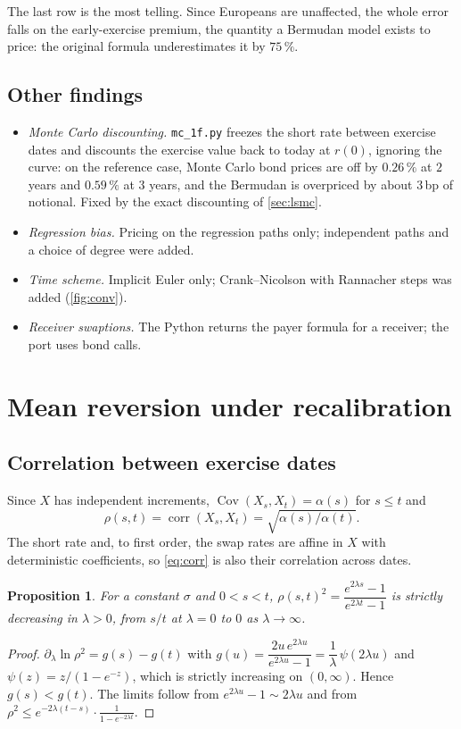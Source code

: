 \documentclass[11pt,a4paper]{article}
\newtheorem{proposition}{Proposition}
\theoremstyle{definition}
\theoremstyle{remark}
\begin{document}
The last row is the most telling. Since Europeans are unaffected, the whole error falls on the early-exercise premium, the
quantity a Bermudan model exists to price: the original formula underestimates it by $75\,\%$.

\subsection{Other findings}
\begin{itemize}
  \item \emph{Monte Carlo discounting.} \texttt{mc\_1f.py} freezes the short rate between exercise dates and discounts the
        exercise value back to today at $r(0)$, ignoring the curve: on the reference case, Monte Carlo bond prices are off by
        $0.26\,\%$ at $2$ years and $0.59\,\%$ at $3$ years, and the Bermudan is overpriced by about $3$\,bp of notional.
        Fixed by the exact discounting of \cref{sec:lsmc}.
  \item \emph{Regression bias.} Pricing on the regression paths only; independent paths and a choice of degree were added.
  \item \emph{Time scheme.} Implicit Euler only; Crank--Nicolson with Rannacher steps was added (\cref{fig:conv}).
  \item \emph{Receiver swaptions.} The Python returns the payer formula for a receiver; the port uses bond calls.
\end{itemize}

\section{Mean reversion under recalibration}\label{sec:meanrev}
\subsection{Correlation between exercise dates}
Since $X$ has independent increments, $\operatorname{Cov}(X_s,X_t)=\alpha(s)$ for $s\le t$ and
\begin{equation}\label{eq:corr}
  \rho(s,t)=\operatorname{corr}(X_s,X_t)=\sqrt{\alpha(s)/\alpha(t)} .
\end{equation}
The short rate and, to first order, the swap rates are affine in $X$ with deterministic coefficients, so \eqref{eq:corr} is
also their correlation across dates.
\begin{proposition}\label{prop:corr}
For a constant $\sigma$ and $0<s<t$, $\rho(s,t)^2=\dfrac{e^{2\lambda s}-1}{e^{2\lambda t}-1}$ is strictly decreasing in
$\lambda>0$, from $s/t$ at $\lambda=0$ to $0$ as $\lambda\to\infty$.
\end{proposition}
\begin{proof}
$\partial_\lambda\ln\rho^2=g(s)-g(t)$ with $g(u)=\dfrac{2u\,e^{2\lambda u}}{e^{2\lambda u}-1}=\dfrac1\lambda\,\psi(2\lambda u)$
and $\psi(z)=z/(1-e^{-z})$, which is strictly increasing on $(0,\infty)$. Hence $g(s)<g(t)$. The limits follow from
$e^{2\lambda u}-1\sim2\lambda u$ and from $\rho^2\le e^{-2\lambda(t-s)}\cdot\frac{1}{1-e^{-2\lambda t}}$.
\end{proof}
\end{document}
